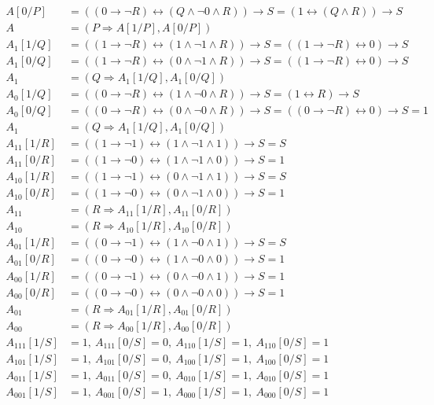\documentclass[a4paper,12pt, centered]{article}
\begin{document}
\begin{enumerate}
\begin{align*}
		A[0/P]&=((0\to\neg R)\leftrightarrow(Q\land\neg 0\land R))\to S=(1\leftrightarrow(Q\land R))\to S\\
		A&=(P\Rightarrow A[1/P], A[0/P])\\
		A_{1}[1/Q]&=((1\to\neg R)\leftrightarrow(1\land\neg 1\land R))\to S=((1\to\neg R)\leftrightarrow0)\to S\\
		A_{1}[0/Q]&=((1\to\neg R)\leftrightarrow(0\land\neg 1\land R))\to S=((1\to\neg R)\leftrightarrow 0)\to S\\
		A_1&=(Q\Rightarrow A_1[1/Q], A_1[0/Q])\\
		A_{0}[1/Q]&=((0\to\neg R)\leftrightarrow(1\land\neg 0\land R))\to S=(1\leftrightarrow R)\to S \\
		A_{0}[0/Q]&=((0\to\neg R)\leftrightarrow(0\land\neg 0\land R))\to S=((0\to\neg R)\leftrightarrow0)\to S=1\\
		A_1&=(Q\Rightarrow A_1[1/Q], A_1[0/Q])\\
		A_{11}[1/R]&=((1\to\neg 1)\leftrightarrow(1\land\neg 1\land 1))\to S=S\\
		A_{11}[0/R]&=((1\to\neg 0)\leftrightarrow(1\land\neg 1\land 0))\to S=1\\
		A_{10}[1/R]&=((1\to\neg 1)\leftrightarrow(0\land\neg 1\land 1))\to S=S\\
		A_{10}[0/R]&=((1\to\neg 0)\leftrightarrow(0\land\neg 1\land 0))\to S=1\\
		A_{11}&=(R\Rightarrow A_{11}[1/R], A_{11}[0/R])\\
		A_{10}&=(R\Rightarrow A_{10}[1/R], A_{10}[0/R])\\
		A_{01}[1/R]&=((0\to\neg 1)\leftrightarrow(1\land\neg 0\land 1))\to S=S\\
		A_{01}[0/R]&=((0\to\neg 0)\leftrightarrow(1\land\neg 0\land 0))\to S=1\\
		A_{00}[1/R]&=((0\to\neg 1)\leftrightarrow(0\land\neg 0\land 1))\to S=1\\
		A_{00}[0/R]&=((0\to\neg 0)\leftrightarrow(0\land\neg 0\land 0))\to S=1\\
		A_{01}&=(R\Rightarrow A_{01}[1/R], A_{01}[0/R])\\
		A_{00}&=(R\Rightarrow A_{00}[1/R], A_{00}[0/R])\\
		A_{111}[1/S]&=1,\>A_{111}[0/S]=0,\>A_{110}[1/S]=1,\>A_{110}[0/S]=1\\
		A_{101}[1/S]&=1,\>A_{101}[0/S]=0,\>A_{100}[1/S]=1,\>A_{100}[0/S]=1\\
		A_{011}[1/S]&=1,\>A_{011}[0/S]=0,\>A_{010}[1/S]=1,\>A_{010}[0/S]=1\\
		A_{001}[1/S]&=1,\>A_{001}[0/S]=1,\>A_{000}[1/S]=1,\>A_{000}[0/S]=1

\end{align*}
\end{enumerate}
\end{document}
